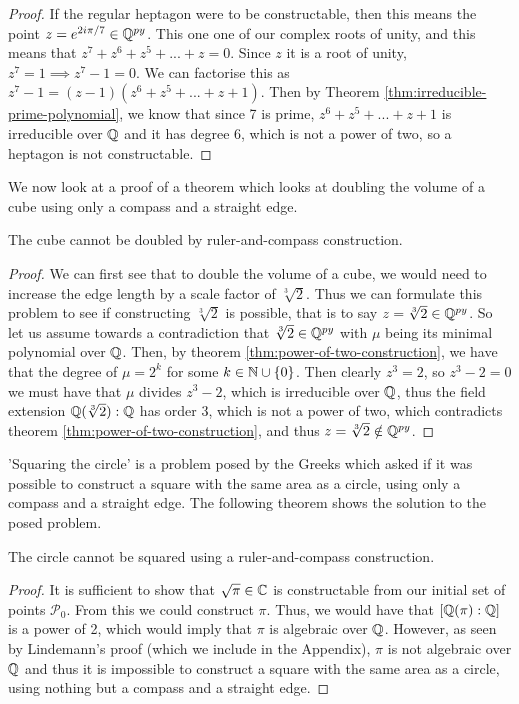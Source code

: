 \begin{proof}
    If the regular heptagon were to be constructable, then this means the point $z=e^{2i\pi/7} \in \mathbb Q^{py}$. This one one of our complex roots of unity, and this means that $z^7+z^6+z^5+...+z=0$. Since $z$ it is a root of unity, $z^7=1 \implies z^7 - 1 = 0$. We can factorise this as $z^7-1=(z-1)(z^6+z^5+...+z+1)$. Then by Theorem \ref{thm:irreducible-prime-polynomial}, we know that since 7 is prime, $z^6+z^5+...+z+1$ is irreducible over $\mathbb Q$ and it has degree 6, which is not a power of two, so a heptagon is not constructable.
\end{proof}

We now look at a proof of a theorem which looks at doubling the volume of a cube using only a compass and a straight edge.

\begin{theorem}
    The cube cannot be doubled by ruler-and-compass construction.
\end{theorem}

\begin{proof}  
    We can first see that to double the volume of a cube, we would need to increase the edge length by a scale factor of $\sqrt[3]{2}$. Thus we can formulate this problem to see if constructing $\sqrt[3]{2}$ is possible, that is to say $z = \sqrt[3]{2} \in \mathbb Q^{py}$.
\noindent
\newline
    So let us assume towards a contradiction that $\sqrt[3]{2} \in \mathbb Q^{py}$ with $\mu$ being its minimal polynomial over $\mathbb Q$. Then, by theorem \ref{thm:power-of-two-construction}, we have that the degree of $\mu = 2^k$ for some $k\in \mathbb N \cup \{0\}$.
\noindent
\newline
    Then clearly $z^3=2$, so $z^3-2=0$ we must have that $\mu$ divides $z^3-2$, which is irreducible over $\mathbb Q$, thus the field extension $\mathbb Q(\sqrt[3]{2}):\mathbb Q$ has order 3, which is not a power of two, which contradicts theorem \ref{thm:power-of-two-construction}, and thus $z = \sqrt[3]{2} \notin \mathbb Q^{py}$.

\end{proof}


'Squaring the circle' is a problem posed by the Greeks which asked if it was possible to construct a square with the same area as a circle, using only a compass and a straight edge. The following theorem shows the solution to the posed problem.

\begin{theorem}
    The circle cannot be squared using a ruler-and-compass construction.
\end{theorem}

\begin{proof}  
    
    It is sufficient to show that $\sqrt{\pi}\in \mathbb C$ is constructable from our initial set of points $\mathcal{P}_0$. From this we could construct $\pi$. Thus, we would have that $[\mathbb Q(\pi):\mathbb Q]$ is a power of 2, which would imply that $\pi$ is algebraic over $\mathbb Q$. However, as seen by Lindemann's proof (which we include in the Appendix), $\pi$ is not algebraic over $\mathbb Q$ and thus it is impossible to construct a square with the same area as a circle, using nothing but a compass and a straight edge.
\end{proof}
